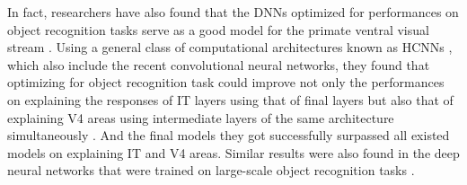In fact, researchers have also found that the DNNs optimized for performances on object recognition tasks serve as a good model for the primate ventral visual stream \cite{Yamins2013, Yamins2014, Cadieu2014}. 
Using a general class of computational architectures known as HCNNs \cite{lecun1995convolutional}, which also include the recent convolutional neural networks, they found that optimizing for object recognition task could improve not only the performances on explaining the responses of IT layers using that of final layers but also that of explaining V4 areas using intermediate layers of the same architecture simultaneously \cite{Cadieu2014}.
And the final models they got successfully surpassed all existed models on explaining IT and V4 areas. Similar results were also found in the deep neural networks that were trained on large-scale object recognition tasks \cite{Yamins2014}. 

